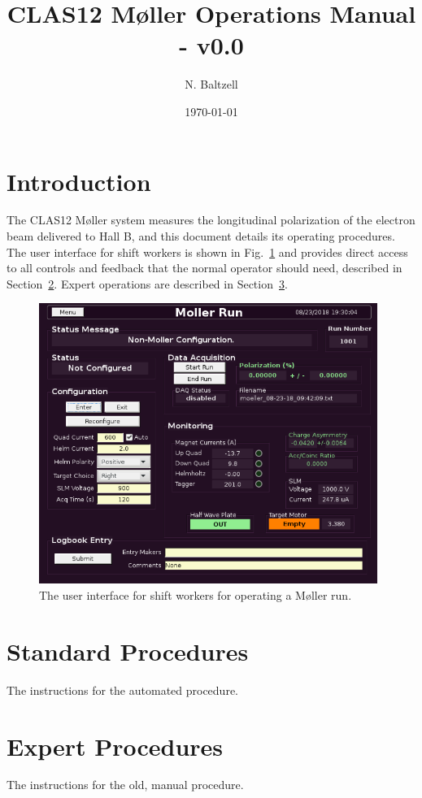 \documentclass[amsmath,amssymb,notitlepage,11pt]{revtex4}
\begin{document}
\title{CLAS12 M{\o}ller Operations Manual - v0.0}
\date{\today}
\author{N. Baltzell}
\begin{abstract}
\end{abstract}

\maketitle

\section{Introduction}
The CLAS12 M{\o}ller system measures the longitudinal polarization of the electron beam delivered to Hall B, and this document details its operating procedures.  The user interface for shift workers is shown in Fig.~\ref{fig:run} and provides direct access to all controls and feedback that the normal operator should need, described in Section~\ref{sec:user}.  Expert operations are described in Section~\ref{sec:expert}.


\begin{figure}[htbp]\centering
    \includegraphics[width=11cm]{pics/run}
    \caption{The user interface for shift workers for operating a M{\o}ller run.\label{fig:run}}
\end{figure}


\section{Standard Procedures}\label{sec:user}
The instructions for the automated procedure.

\section{Expert Procedures}\label{sec:expert}
The instructions for the old, manual procedure.
\end{document}
